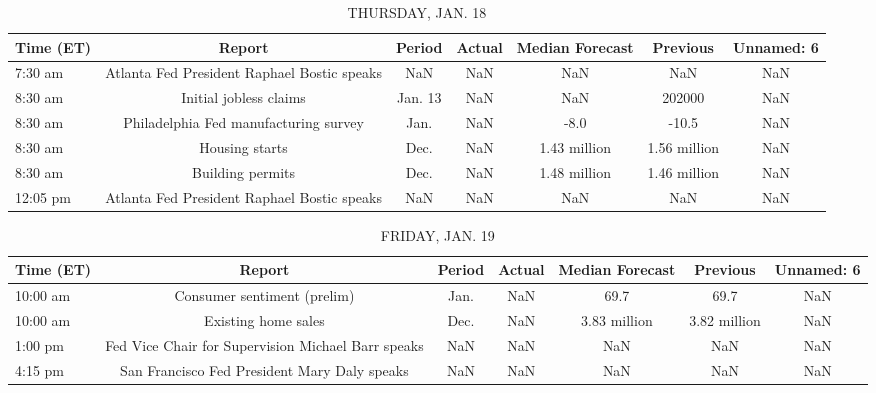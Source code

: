 \documentclass{article}%
\begin{document}
\begin{table}[htbp]%
\caption{THURSDAY, JAN. 18}%
\centering%
\begin{adjustbox}{width=1\textwidth}%
\begin{tabular}{lcccccc}
\toprule
Time (ET) &                                      Report &  Period & Actual & Median Forecast &     Previous & Unnamed: 6 \\
\midrule
  7:30 am & Atlanta Fed President Raphael Bostic speaks &     NaN &    NaN &             NaN &          NaN &        NaN \\
  8:30 am &                      Initial jobless claims & Jan. 13 &    NaN &             NaN &       202000 &        NaN \\
  8:30 am &       Philadelphia Fed manufacturing survey &    Jan. &    NaN &            -8.0 &        -10.5 &        NaN \\
  8:30 am &                              Housing starts &    Dec. &    NaN &    1.43 million & 1.56 million &        NaN \\
  8:30 am &                            Building permits &    Dec. &    NaN &    1.48 million & 1.46 million &        NaN \\
 12:05 pm & Atlanta Fed President Raphael Bostic speaks &     NaN &    NaN &             NaN &          NaN &        NaN \\
\bottomrule
\end{tabular}
%
\end{adjustbox}%
\end{table}

%


\begin{table}[htbp]%
\caption{FRIDAY, JAN. 19}%
\centering%
\begin{adjustbox}{width=1\textwidth}%
\begin{tabular}{lcccccc}
\toprule
Time (ET) &                                             Report & Period & Actual & Median Forecast &     Previous & Unnamed: 6 \\
\midrule
 10:00 am &                        Consumer sentiment (prelim) &   Jan. &    NaN &            69.7 &         69.7 &        NaN \\
 10:00 am &                                Existing home sales &   Dec. &    NaN &    3.83 million & 3.82 million &        NaN \\
  1:00 pm & Fed Vice Chair for Supervision Michael Barr speaks &    NaN &    NaN &             NaN &          NaN &        NaN \\
  4:15 pm &       San Francisco Fed President Mary Daly speaks &    NaN &    NaN &             NaN &          NaN &        NaN \\
\bottomrule
\end{tabular}
%
\end{adjustbox}%
\end{table}
\end{document}
